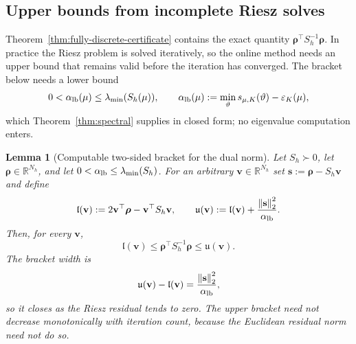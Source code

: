 \documentclass[11pt]{amsart}
\newtheorem{lemma}[theorem]{Lemma}
\theoremstyle{remark}
\newcommand{\R}{\mathbb{R}}
\newcommand{\Sh}{S_h}
\newcommand{\norm}[1]{\left\lVert #1\right\rVert}
\newcommand{\rr}{\bm\rho}
\newcommand{\vv}{\mathbf v}
\newcommand{\sres}{\mathbf s}
\newcommand{\sym}[1]{#1}                 %
\begin{document}
\subsection{Upper bounds from incomplete Riesz solves}
\label{ssec:guaranteed}
Theorem~\ref{thm:fully-discrete-certificate} contains the exact quantity
$\rr^\top\Sh^{-1}\rr$.  In practice the Riesz problem is solved iteratively,
so the online method needs an upper bound that remains valid before the
iteration has converged.  The bracket below needs a lower bound
\begin{equation}
  0<\alpha_{\rm lb}(\mu)\le \lambda_{\min}(\Sh(\mu)),
  \qquad \alpha_{\rm lb}(\mu):=\min_\vartheta\sym{s}_{\mu,K}(\vartheta)-\varepsilon_K(\mu),
  \label{eq:alpha-lb}
\end{equation}
which Theorem~\ref{thm:spectral} supplies in closed form; no eigenvalue computation enters.
\begin{lemma}[Computable two-sided bracket for the dual norm]
\label{lem:guaranteed}
Let $\Sh\succ0$, let $\rr\in\R^{N_h}$, and let
$0<\alpha_{\rm lb}\le\lambda_{\min}(\Sh)$.  For an arbitrary
$\vv\in\R^{N_h}$ set $\sres:=\rr-\Sh\vv$ and define
\begin{equation}
  \mathfrak l(\vv):=2\vv^\top\rr-\vv^\top\Sh\vv,
  \qquad
  \mathfrak u(\vv):=\mathfrak l(\vv)
    +\frac{\norm{\sres}_2^2}{\alpha_{\rm lb}}.
  \label{eq:riesz-bracket-def}
\end{equation}
Then, for every $\vv$,
\begin{equation}
 \boxed{
   \mathfrak l(\vv)
   \le \rr^\top\Sh^{-1}\rr
   \le \mathfrak u(\vv).}
 \label{eq:riesz-bracket}
\end{equation}
The bracket width is
\begin{equation}
  \mathfrak u(\vv)-\mathfrak l(\vv)
  =\frac{\norm{\sres}_2^2}{\alpha_{\rm lb}},
  \label{eq:bracket-width}
\end{equation}
so it closes as the Riesz residual tends to zero. The upper bracket need
not decrease monotonically with iteration count, because the Euclidean
residual norm need not do so.
\end{lemma}
\end{document}
